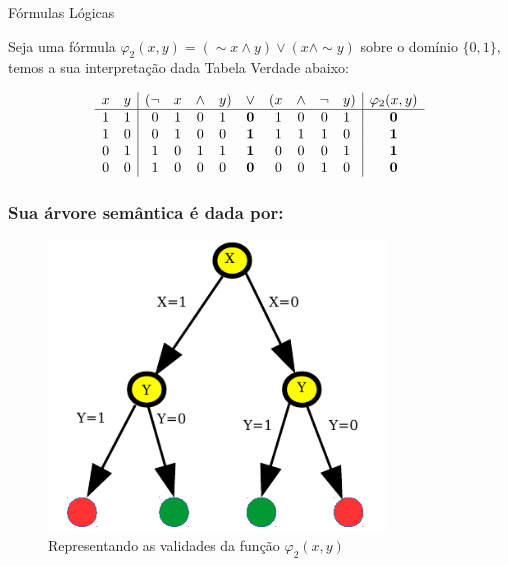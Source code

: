 \documentclass{beamer}
\begin{document}
\begin{frame}
\begin{block}{Fórmulas Lógicas}


Seja uma fórmula $\varphi_2 (x,y) = (\sim x \wedge y)\vee (x \wedge \sim y)$ 
sobre  o domínio $\{0 , 1\}$,
temos a sua interpretação dada Tabela Verdade abaixo:

$$
\begin{array}{cc|c@{}cccc@{}ccc@{}cccc@{}c | c}
x & y & ( &\lnot&x&\land&y&)&\lor&(&x&\land&\lnot&y&) & \varphi_2 (x,y) \\ \hline
1&1&&0&1&0&1&&\mathbf{0}&&1&0&0&1& & \mathbf{0}  \\
1&0&&0&1&0&0&&\mathbf{1}&&1&1&1&0& & \mathbf{1} \\
0&1&&1&0&1&1&&\mathbf{1}&&0&0&0&1& & \mathbf{1} \\
0&0&&1&0&0&0&&\mathbf{0}&&0&0&1&0& & \mathbf{0}
\end{array}
$$

\end{block}

\end{frame}

\begin{frame}
\frametitle{Sua árvore semântica é dada por:}

\begin{figure}[ht!]
 \centering
 \includegraphics[width=0.8\textwidth , height=0.65\textheight]{xy_tree.pdf}
 \caption{Representando as validades da função $\varphi_2 (x,y)$} 
\end{figure}

\end{frame}
\end{document}
